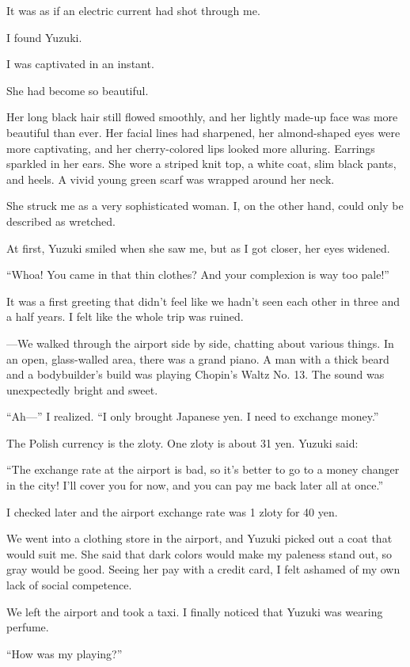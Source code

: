 \documentclass[
    a4paper,
    12pt,
    twoside,
    openany,
    UTF8,
    fontset=windows
]{ctexbook}
\begin{document}
It was as if an electric current had shot through me.

I found Yuzuki.

I was captivated in an instant.

She had become so beautiful.

Her long black hair still flowed smoothly, and her lightly made-up face was more beautiful than ever. Her facial lines had sharpened, her almond-shaped eyes were more captivating, and her cherry-colored lips looked more alluring. Earrings sparkled in her ears. She wore a striped knit top, a white coat, slim black pants, and heels. A vivid young green scarf was wrapped around her neck.

She struck me as a very sophisticated woman. I, on the other hand, could only be described as wretched.

At first, Yuzuki smiled when she saw me, but as I got closer, her eyes widened.

``Whoa! You came in that thin clothes? And your complexion is way too pale!''

It was a first greeting that didn't feel like we hadn't seen each other in three and a half years. I felt like the whole trip was ruined.

---We walked through the airport side by side, chatting about various things. In an open, glass-walled area, there was a grand piano. A man with a thick beard and a bodybuilder's build was playing Chopin's Waltz No. 13. The sound was unexpectedly bright and sweet.

``Ah---'' I realized. ``I only brought Japanese yen. I need to exchange money.''

The Polish currency is the zloty. One zloty is about 31 yen. Yuzuki said:

``The exchange rate at the airport is bad, so it's better to go to a money changer in the city! I'll cover you for now, and you can pay me back later all at once.''

I checked later and the airport exchange rate was 1 zloty for 40 yen.

We went into a clothing store in the airport, and Yuzuki picked out a coat that would suit me. She said that dark colors would make my paleness stand out, so gray would be good. Seeing her pay with a credit card, I felt ashamed of my own lack of social competence.

We left the airport and took a taxi. I finally noticed that Yuzuki was wearing perfume.

``How was my playing?''
\end{document}
